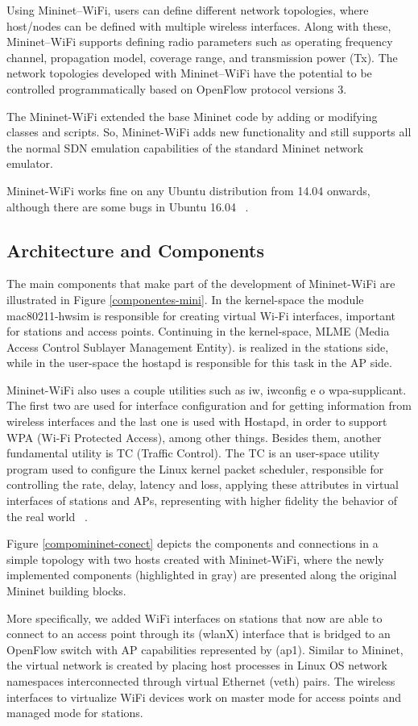 \documentclass[
  oneside,
  11pt, a4paper,
  footinclude=true,
  headinclude=true,
  cleardoublepage=empty
]{scrbook}
\begin{document}
Using Mininet–WiFi, users can define different network topologies, where host/nodes can be defined with multiple wireless interfaces. Along with these, Mininet–WiFi supports defining radio parameters such as operating frequency channel, propagation model, coverage range, and transmission power (Tx). The network topologies developed with Mininet–WiFi have the potential to be controlled programmatically based on OpenFlow protocol versions 3. 

The Mininet-WiFi extended the base Mininet code by adding or modifying classes and scripts. So, Mininet-WiFi adds new functionality and still supports all the normal SDN emulation capabilities of the standard Mininet network emulator.

Mininet-WiFi works fine on any Ubuntu distribution from 14.04 onwards, although there are some bugs in Ubuntu 16.04 ~\cite{mininet-wifibook}.

\subsection{Architecture and Components}

The main components that make part of the development of Mininet-WiFi are illustrated in Figure \ref{componentes-mini}. In the kernel-space the module mac80211-hwsim is responsible for creating virtual Wi-Fi interfaces, important for stations and access points. Continuing in the kernel-space, MLME (Media Access Control Sublayer Management Entity). is realized in the stations side, while in the user-space the hostapd is responsible for this task in the AP side.\par
Mininet-WiFi also uses a couple utilities such as iw, iwconfig e o wpa-supplicant. The first two are used for interface configuration and for getting information from wireless interfaces and the last one is used with Hostapd, in order to support WPA (Wi-Fi Protected Access), among other things. Besides them, another fundamental utility is TC (Traffic Control). The TC is an user-space utility program used to configure the Linux kernel packet scheduler, responsible for controlling the rate, delay, latency and loss, applying these attributes in virtual interfaces of stations and APs, representing with higher fidelity the behavior of the real world ~\cite{mininet-wifibook}.\par
Figure \ref{compomininet-conect} depicts the components and connections in a simple topology with two hosts created with Mininet-WiFi, where the newly implemented components (highlighted in gray) are presented along the original Mininet building blocks.\par
More specifically, we added WiFi interfaces on stations that now are able to connect to an access point through its (wlanX) interface that is bridged to an OpenFlow switch with AP capabilities represented by (ap1). Similar to Mininet, the virtual network is created by placing host processes in Linux OS network namespaces interconnected through virtual Ethernet (veth) pairs. The wireless interfaces to virtualize WiFi devices work on master mode for access points and managed mode for stations.\par
\end{document}
